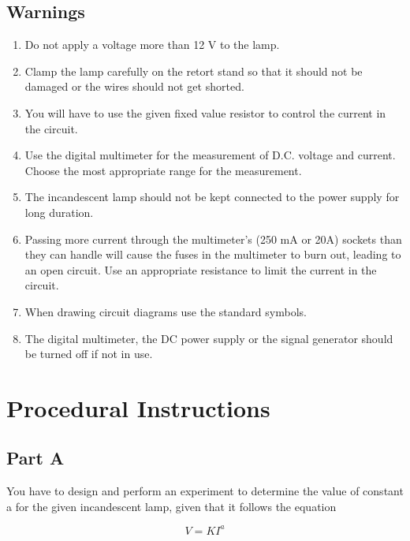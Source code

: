 \subsection*{Warnings}

\begin{enumerate}
\item Do not apply a voltage more than 12 V to the lamp.
\item Clamp the lamp carefully on the retort stand so that it should not be damaged or the wires should not get shorted.
\item You will have to use the given fixed value resistor to control the current in the circuit.
\item Use the digital multimeter for the measurement of D.C. voltage and current.  Choose the most appropriate range for the measurement.
\item The incandescent lamp should not be kept connected to the power supply for long duration. 

\item Passing more current through the multimeter's (250 mA or 20A) sockets than they can handle will cause the fuses in the multimeter to burn out, leading to an open circuit. Use an appropriate resistance to limit the current in the circuit.

\item When drawing circuit diagrams use the standard symbols.

\item The digital multimeter, the DC power supply or the signal generator should be turned off if not in use.

\end{enumerate}


\section*{Procedural Instructions}

\subsection*{Part A}

You have to design and perform an experiment to determine the value of constant a for the given incandescent lamp, given that it follows the equation 

\begin{equation*}
V = K I^a
\end{equation*}

